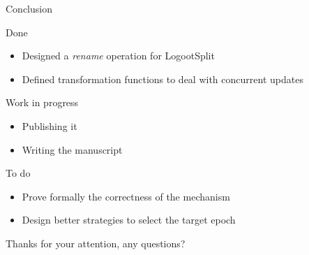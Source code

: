 \documentclass[10pt]{beamer}
\begin{document}
\begin{frame}{Conclusion}
  \begin{block}{Done}
    \vspace{-1mm}
    \begin{itemize}
      \item Designed a \emph{rename} operation for LogootSplit
      \item Defined transformation functions to deal with concurrent updates
    \end{itemize}
  \end{block}

  \pause

  \begin{block}{Work in progress}
    \vspace{-1mm}
    \begin{itemize}
      \item Publishing it
      \item Writing the manuscript
    \end{itemize}
  \end{block}

  \pause

  \begin{block}{To do}
    \vspace{-1mm}
    \begin{itemize}
      \item Prove formally the correctness of the mechanism
      \item Design better strategies to select the target epoch
    \end{itemize}
  \end{block}
\end{frame}

\begin{frame}[standout]
  Thanks for your attention, any questions?
  \vspace{3em}
  \begin{center}
    \ccby
  \end{center}
\end{frame}
\end{document}
